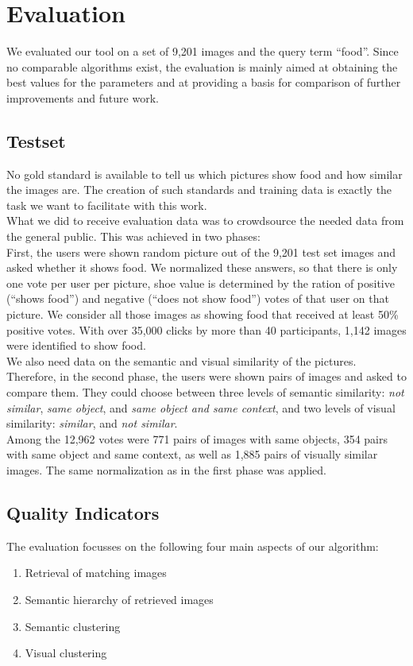 %
\section{Evaluation}
\label{sec_evaluation}

We evaluated our tool on a set of 9,201 images and the query term ``food''. Since no comparable algorithms exist, the evaluation is mainly aimed at obtaining the best values for the parameters and at providing a basis for comparison of further improvements and future work.

\subsection{Testset}
\label{sec_testset}
No gold standard is available to tell us which pictures show food and how similar the images are. The creation of such standards and training data is exactly the task we want to facilitate with this work.\\ 
What we did to receive evaluation data was to crowdsource the needed data from the general public. This was achieved in two phases:\\

First, the users were shown random picture out of the 9,201 test set images and asked whether it shows food. We normalized these answers, so that there is only one vote per user per picture, shoe value is determined by the ration of positive (``shows food'') and negative (``does not show food'') votes of that user on that picture. We consider all those images as showing food that received at least 50\% positive votes. With over 35,000 clicks by more than 40 participants, 1,142 images were identified to show food. \\

We also need data on the semantic and visual similarity of the pictures. Therefore, in the second phase, the users were shown pairs of images and asked to compare them. They could choose between three levels of semantic similarity: \emph{not similar}, \emph{same object}, and \emph{same object and same context}, and two levels of visual similarity: \emph{similar}, and \emph{not similar}.\\
Among the 12,962 votes were 771 pairs of images with same objects, 354 pairs with same object and same context, as well as 1,885 pairs of visually similar images. The same normalization as in the first phase was applied.

\subsection{Quality Indicators}
The evaluation focusses on the following four main aspects of our algorithm:
\begin{enumerate}
\item Retrieval of matching images
\item Semantic hierarchy of retrieved images
\item Semantic clustering
\item Visual clustering
\end{enumerate}

